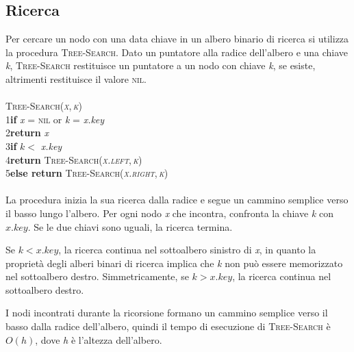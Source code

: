 \documentclass[10pt, a4paper]{report}
\newcommand\firsttab[1][0.5cm]{\hspace*{#1}}
\newcommand\secondtab[1][1cm]{\hspace*{#1}}
\begin{document}
\subsection{Ricerca}
Per cercare un nodo con una data chiave in un albero binario di ricerca si utilizza la procedura \textsc{Tree-Search}. Dato un puntatore alla radice dell'albero e una chiave \textit{k}, \textsc{Tree-Search} restituisce un puntatore a un nodo con chiave \textit{k}, se esiste, altrimenti restituisce il valore \textsc{nil}.\\\\
\textsc{Tree-Search(\textit{x},\,\textit{k})}\\
1\firsttab\textbf{if} \textit{x} = \textsc{nil} or \textit{k} = \textit{x.key}\\
2\secondtab\textbf{return} \textit{x}\\
3\firsttab\textbf{if} $k < $ \textit{x.key}\\
4\secondtab\textbf{return} \textsc{Tree-Search(\textit{x.left},\,\textit{k})}\\
5\firsttab\textbf{else return} \textsc{Tree-Search(\textit{x.right},\,\textit{k})}\\\\
La procedura inizia la sua ricerca dalla radice e segue un cammino semplice verso il basso lungo l'albero. Per ogni nodo \textit{x} che incontra, confronta la chiave \textit{k} con $x.key$. Se le due chiavi sono uguali, la ricerca termina.

Se $k < x.key$, la ricerca continua nel sottoalbero sinistro di \textit{x}, in quanto la proprietà degli alberi binari di ricerca implica che \textit{k} non può essere memorizzato nel sottoalbero destro. Simmetricamente, se $k > x.key$, la ricerca continua nel sottoalbero destro.

I nodi incontrati durante la ricorsione formano un cammino semplice verso il basso dalla radice dell'albero, quindi il tempo di esecuzione di \textsc{Tree-Search} è $O(h)$, dove \textit{h} è l'altezza dell'albero.
\end{document}
